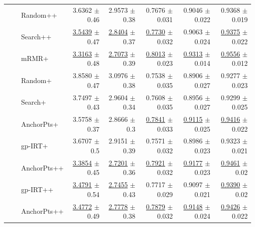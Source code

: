 \begin{longtable}{llp{}rrrrr}
 &  & Random++ & 3.6362 {\scriptsize $\pm$ 0.46} & 2.9573 {\scriptsize $\pm$ 0.38} & 0.7676 {\scriptsize $\pm$ 0.031} & 0.9046 {\scriptsize $\pm$ 0.022} & 0.9368 {\scriptsize $\pm$ 0.019} \\
 &  & Search++ & \underline{3.5439} {\scriptsize $\pm$ 0.47} & \underline{2.8404} {\scriptsize $\pm$ 0.37} & \underline{0.7730} {\scriptsize $\pm$ 0.032} & 0.9063 {\scriptsize $\pm$ 0.024} & \underline{0.9375} {\scriptsize $\pm$ 0.022} \\
 &  & mRMR+ & \underline{3.3163} {\scriptsize $\pm$ 0.48} & \underline{2.7073} {\scriptsize $\pm$ 0.39} & \underline{0.8013} {\scriptsize $\pm$ 0.023} & \underline{0.9313} {\scriptsize $\pm$ 0.014} & \underline{0.9556} {\scriptsize $\pm$ 0.012} \\
 &  & Random+ & 3.8580 {\scriptsize $\pm$ 0.47} & 3.0976 {\scriptsize $\pm$ 0.38} & 0.7538 {\scriptsize $\pm$ 0.035} & 0.8906 {\scriptsize $\pm$ 0.027} & 0.9277 {\scriptsize $\pm$ 0.023} \\
 &  & Search+ & 3.7497 {\scriptsize $\pm$ 0.43} & 2.9604 {\scriptsize $\pm$ 0.34} & 0.7608 {\scriptsize $\pm$ 0.035} & 0.8956 {\scriptsize $\pm$ 0.027} & 0.9299 {\scriptsize $\pm$ 0.025} \\
 &  & AnchorPts+ & 3.5758 {\scriptsize $\pm$ 0.37} & 2.8666 {\scriptsize $\pm$ 0.3} & \underline{0.7841} {\scriptsize $\pm$ 0.033} & \underline{0.9115} {\scriptsize $\pm$ 0.025} & \underline{0.9416} {\scriptsize $\pm$ 0.022} \\
 &  & gp-IRT+ & 3.6707 {\scriptsize $\pm$ 0.5} & 2.9151 {\scriptsize $\pm$ 0.39} & 0.7571 {\scriptsize $\pm$ 0.032} & 0.8986 {\scriptsize $\pm$ 0.023} & 0.9323 {\scriptsize $\pm$ 0.021} \\
 &  & AnchorPts++ & \underline{3.3854} {\scriptsize $\pm$ 0.45} & \underline{2.7201} {\scriptsize $\pm$ 0.36} & \underline{0.7921} {\scriptsize $\pm$ 0.032} & \underline{0.9177} {\scriptsize $\pm$ 0.023} & \underline{0.9461} {\scriptsize $\pm$ 0.02} \\
 &  & gp-IRT++ & \underline{3.4791} {\scriptsize $\pm$ 0.54} & \underline{2.7455} {\scriptsize $\pm$ 0.43} & 0.7717 {\scriptsize $\pm$ 0.029} & 0.9097 {\scriptsize $\pm$ 0.021} & \underline{0.9390} {\scriptsize $\pm$ 0.02} \\
 &  & AnchorPts++ & \underline{3.4772} {\scriptsize $\pm$ 0.49} & \underline{2.7778} {\scriptsize $\pm$ 0.38} & \underline{0.7879} {\scriptsize $\pm$ 0.032} & \underline{0.9148} {\scriptsize $\pm$ 0.024} & \underline{0.9426} {\scriptsize $\pm$ 0.022} \\

\end{longtable}
